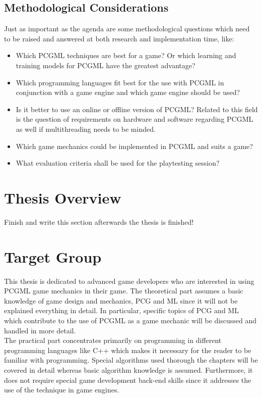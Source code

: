 \documentclass[MGS,Master,english]{twbook}%
\begin{document}
\subsection{Methodological Considerations}
Just as important as the agenda are some methodological questions which need to be raised and answered at both research and implementation time, like:
\begin{itemize}
	\item Which \ac{PCGML} techniques are best for a game? Or which learning and training models for \ac{PCGML} have the greatest advantage?
	\item Which programming languages fit best for the use with \ac{PCGML} in conjunction with a game engine and which game engine should be used? 
	\item Is it better to use an online or offline version of \ac{PCGML}? Related to this field is the question of requirements on hardware and software regarding \ac{PCGML} as well if multithreading needs to be minded.
	\item Which game mechanics could be implemented in \ac{PCGML} and suits a game?
	\item What evaluation criteria shall be used for the playtesting session?
\end{itemize} 


\section{Thesis Overview}
Finish and write this section afterwards the thesis is finished!

\section{Target Group}
This thesis is dedicated to advanced game developers who are interested in using PCGML game mechanics in their game. The theoretical part assumes a basic knowledge of game design and mechanics, PCG and ML since it will not be explained everything in detail. In particular, specific topics of PCG and ML which contribute to the use of PCGML as a game mechanic will be discussed and handled in more detail.\\
The practical part concentrates primarily on programming in different programming languages like C++ which makes it necessary for the reader to be familiar with programming. Special algorithms used thorough the chapters will be covered in detail whereas basic algorithm knowledge is assumed. Furthermore, it does not require special game development back-end skills since it addresses the use of the technique in game engines.
\end{document}
